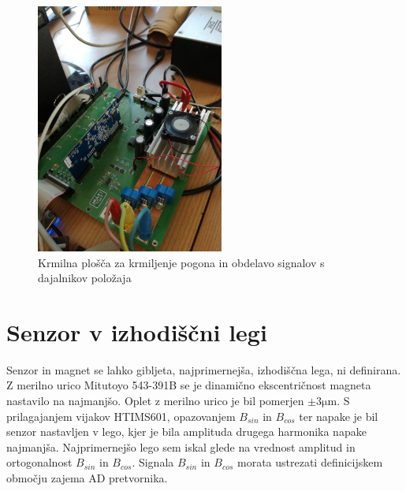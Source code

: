\begin{figure}[!ht]
	\centering
	\includegraphics[width=0.55\textwidth]{./Slike/krmilnaplosca.jpg}
	\caption{Krmilna plošča za krmiljenje pogona in obdelavo signalov s dajalnikov položaja}
	\label{krmilnaplosca.jpg}
\end{figure}
\newpage
\section{Senzor v izhodiščni legi}
Senzor in magnet se lahko gibljeta, najprimernejša, izhodiščna lega, ni definirana. Z merilno urico Mitutoyo 543-391B se je dinamično ekscentričnost magneta nastavilo na najmanjšo. Oplet z merilno urico je bil pomerjen $\pm 3 \mathrm{\mu m}$.
S prilagajanjem vijakov HTIMS601, opazovanjem $B_{sin}$ in $B_{cos}$ ter napake je bil senzor nastavljen v lego, kjer je bila amplituda drugega harmonika napake najmanjša. Najprimernejšo lego sem iskal glede na vrednost amplitud in ortogonalnost  $B_{sin}$ in $B_{cos}$. Signala $B_{sin}$ in $B_{cos}$ morata ustrezati definicijskem območju zajema AD pretvornika.

